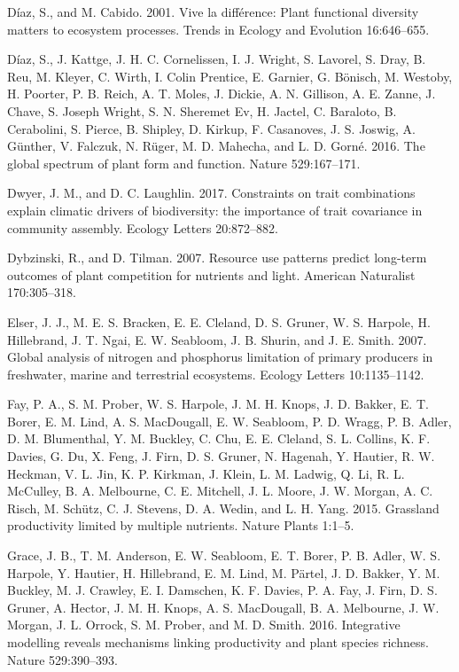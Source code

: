 \documentclass[twoside,12pt,final]{ucthesis-CA2012}
\begin{document}
\begin{ucmainmatter}
\leavevmode\hypertarget{ref-Diaz2001}{}%
Díaz, S., and M. Cabido. 2001. Vive la différence: Plant functional diversity matters to ecosystem processes. Trends in Ecology and Evolution 16:646--655.

\leavevmode\hypertarget{ref-Diaz2016}{}%
Díaz, S., J. Kattge, J. H. C. Cornelissen, I. J. Wright, S. Lavorel, S. Dray, B. Reu, M. Kleyer, C. Wirth, I. Colin Prentice, E. Garnier, G. Bönisch, M. Westoby, H. Poorter, P. B. Reich, A. T. Moles, J. Dickie, A. N. Gillison, A. E. Zanne, J. Chave, S. Joseph Wright, S. N. Sheremet Ev, H. Jactel, C. Baraloto, B. Cerabolini, S. Pierce, B. Shipley, D. Kirkup, F. Casanoves, J. S. Joswig, A. Günther, V. Falczuk, N. Rüger, M. D. Mahecha, and L. D. Gorné. 2016. The global spectrum of plant form and function. Nature 529:167--171.

\leavevmode\hypertarget{ref-Dwyer2017}{}%
Dwyer, J. M., and D. C. Laughlin. 2017. Constraints on trait combinations explain climatic drivers of biodiversity: the importance of trait covariance in community assembly. Ecology Letters 20:872--882.

\leavevmode\hypertarget{ref-Dybzinski2007a}{}%
Dybzinski, R., and D. Tilman. 2007. Resource use patterns predict long-term outcomes of plant competition for nutrients and light. American Naturalist 170:305--318.

\leavevmode\hypertarget{ref-Elser2007}{}%
Elser, J. J., M. E. S. Bracken, E. E. Cleland, D. S. Gruner, W. S. Harpole, H. Hillebrand, J. T. Ngai, E. W. Seabloom, J. B. Shurin, and J. E. Smith. 2007. Global analysis of nitrogen and phosphorus limitation of primary producers in freshwater, marine and terrestrial ecosystems. Ecology Letters 10:1135--1142.

\leavevmode\hypertarget{ref-Fay2015}{}%
Fay, P. A., S. M. Prober, W. S. Harpole, J. M. H. Knops, J. D. Bakker, E. T. Borer, E. M. Lind, A. S. MacDougall, E. W. Seabloom, P. D. Wragg, P. B. Adler, D. M. Blumenthal, Y. M. Buckley, C. Chu, E. E. Cleland, S. L. Collins, K. F. Davies, G. Du, X. Feng, J. Firn, D. S. Gruner, N. Hagenah, Y. Hautier, R. W. Heckman, V. L. Jin, K. P. Kirkman, J. Klein, L. M. Ladwig, Q. Li, R. L. McCulley, B. A. Melbourne, C. E. Mitchell, J. L. Moore, J. W. Morgan, A. C. Risch, M. Schütz, C. J. Stevens, D. A. Wedin, and L. H. Yang. 2015. Grassland productivity limited by multiple nutrients. Nature Plants 1:1--5.

\leavevmode\hypertarget{ref-Grace2016a}{}%
Grace, J. B., T. M. Anderson, E. W. Seabloom, E. T. Borer, P. B. Adler, W. S. Harpole, Y. Hautier, H. Hillebrand, E. M. Lind, M. Pärtel, J. D. Bakker, Y. M. Buckley, M. J. Crawley, E. I. Damschen, K. F. Davies, P. A. Fay, J. Firn, D. S. Gruner, A. Hector, J. M. H. Knops, A. S. MacDougall, B. A. Melbourne, J. W. Morgan, J. L. Orrock, S. M. Prober, and M. D. Smith. 2016. Integrative modelling reveals mechanisms linking productivity and plant species richness. Nature 529:390--393.


\end{ucmainmatter}
\end{document}
